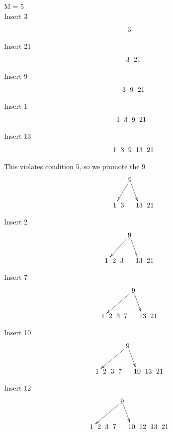 \documentclass[a4paper]{article}
\begin{document}

M = 5 \\
Insert 3\\
$$\xymatrix @C=0pt {
 & &  &  & & 3 & & &  &  &  \\
}$$

Insert 21\\
$$\xymatrix @C=0pt {
 & &  &  & & 3 & 21 &  &  &  \\
}$$

Insert 9\\
$$\xymatrix @C=0pt {
 & &  &  & & 3 & 9 & 21 &  &  &  \\
}$$

Insert 1\\
$$\xymatrix @C=0pt {
 & &  &  & 1 & 3 & 9 & 21 &  &  &  \\
}$$

Insert 13\\
$$\xymatrix @C=0pt {
 & &  &  & 1 & 3 & 9 & 13 & 21 &  &  \\
}$$

This violates condition 5, so we promote the 9 \\
$$\xymatrix @C=0pt {
& &  &  &    &   & \ar[dll] 9 \ar[dr] & &   &  &  \\
 & &  &  & 1 & 3 &  & 13 & 21 &  &  \\
}$$

Insert 2\\
$$\xymatrix @C=0pt {
& &  &  &    & \ar[dlll] 9 \ar[dr] & &   &  &  \\
 &  & 1 & 2 & 3 &  & 13 & 21 &  &  \\
}$$

Insert 7\\
$$\xymatrix @C=0pt {
& &  &  &    &   & \ar[dllll] 9 \ar[dr] & &   &  &  \\
 &  & 1 & 2 & 3 & 7 &  & 13 & 21 &  &  \\
}$$

Insert 10\\
$$\xymatrix @C=0pt {
& &  &  &    &   & \ar[dllll] 9 \ar[dr] & &   &  &  \\
 &  & 1 & 2 & 3 & 7 &  & 10 & 13 & 21 &  &  \\
}$$

Insert 12\\
$$\xymatrix @C=0pt {
& &  &  &    &   & \ar[dllll] 9 \ar[dr] & &   &  &  \\
 &  & 1 & 2 & 3 & 7 &  & 10 & 12 & 13 & 21 &  &  \\
}$$
\end{document}

